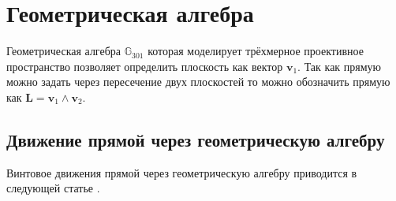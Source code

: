 

  \section{Геометрическая алгебра}

  Геометрическая алгебра $\mathbb{G}_{301}$ которая моделирует трёхмерное проективное пространство позволяет определить плоскость 
  как вектор $\mathbf{v}_1$. Так как прямую можно задать через пересечение двух плоскостей то можно
  обозначить прямую как $\mathbf{L} = \mathbf{v}_1 \wedge \mathbf{v}_2$.

  \subsection{Движение прямой через геометрическую алгебру}
  Винтовое движения прямой через геометрическую алгебру приводится в следующей статье \autocite{ruheGeometricCliffordAlgebra2023}. 




